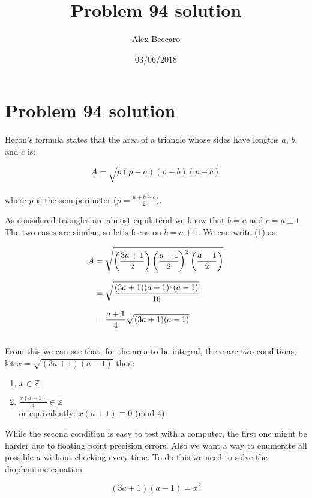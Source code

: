 \documentclass[a4paper,12pt]{article}
\title{Problem 94 solution}
\author{Alex Beccaro}
\date{03/06/2018}
\begin{document}
\newpage

\section{Problem 94 solution}

	Heron's formula states that the area of a triangle whose sides have lengths $a$, $b$, and $c$ is:
	
	\begin{equation}
		A= \sqrt{p(p-a)(p-b)(p-c)}
	\end{equation}\\
	
	where $p$ is the semiperimeter ($p = \frac{a + b + c}{2}$).
	
	As considered triangles are almost equilateral we know that $b = a$ and $c = a \pm 1$. The two cases are similar, so let's focus on $b = a + 1$. We can write (1) as:

	\begin{equation}
	\setlength{\jot}{10pt}
	\begin{split}
		A & = \sqrt{\left(\frac{3a + 1}{2}\right) \left(\frac{a + 1}{2}\right)^{2} \left(\frac{a-1}{2}\right)} \\
		& = \sqrt{\frac{(3a + 1)(a + 1)^{2}(a - 1)}{16}} \\
		& = \frac{a + 1}{4}\sqrt{(3a + 1)(a - 1)}\\
	\end{split}
	\end{equation}\\
	
	From this we can see that, for the area to be integral, there are two conditions, let $x = \sqrt{(3a + 1)(a - 1)}$ then:\\
	
	\begin{enumerate}
		\item $x \in \mathbb{Z}$
		\item $\frac{x(a + 1)}{4} \in \mathbb{Z}$ \\
			or equivalently: $x(a + 1) \equiv 0$ (mod $4$)\\
	\end{enumerate}
	
	While the second condition is easy to test with a computer, the first one might be harder due to floating point precision errors. Also we want a way to enumerate all possible $a$ without checking every time. To do this we need to solve the diophantine equation
	
	\begin{equation}
		(3a + 1)(a - 1) = x^{2}
	\end{equation}
	
\end{document}
